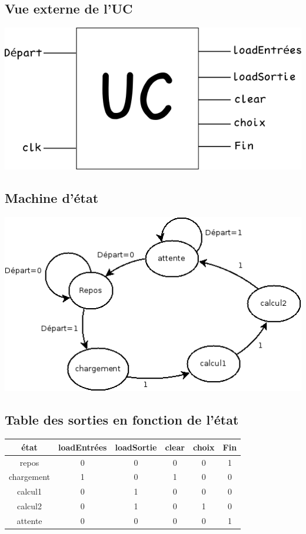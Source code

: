 \documentclass[a4paper]{report}
\begin{document}
\subsection{Vue externe de l'UC}
\begin{center}
	\includegraphics[scale=0.7]{uc.png}
\end{center}
\subsection{Machine d'état}
\begin{center}
	\includegraphics[scale=0.5]{machineEtat.png}
\end{center}

\subsection{Table des sorties en fonction de l'état}
\begin{center}
	\begin{tabular}{|c|c|c|c|c|c|}
		\hline
		état & loadEntrées & loadSortie & clear & choix & Fin \\
		\hline
		repos & 0 & 0 & 0 & 0 & 1 \\
		\hline
		chargement & 1 & 0 & 1 & 0 & 0 \\
		\hline
		calcul1 & 0 & 1 & 0 & 0 & 0 \\
		\hline
		calcul2 & 0 & 1 & 0 & 1 & 0 \\
		\hline
		attente & 0 & 0 & 0 & 0 & 1 \\
		\hline
	\end{tabular}
\end{center}
\end{document}
